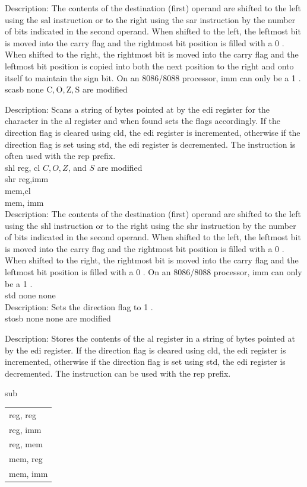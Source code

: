 \documentclass[10pt]{article}
\begin{document}
Description: The contents of the destination (first) operand are shifted to the left using the sal instruction or to the right using the sar instruction by the number of bits indicated in the second operand. When shifted to the left, the leftmost bit is moved into the carry flag and the rightmost bit position is filled with a 0 . When shifted to the right, the rightmost bit is moved into the carry flag and the leftmost bit position is copied into both the next position to the right and onto itself to maintain the sign bit. On an 8086/8088 processor, imm can only be a 1 .\\
scasb none $\mathrm{C}, \mathrm{O}, \mathrm{Z}, \mathrm{S}$ are modified

Description: Scans a string of bytes pointed at by the edi register for the character in the al register and when found sets the flags accordingly. If the direction flag is cleared using cld, the edi register is incremented, otherwise if the direction flag is set using std, the edi register is decremented. The instruction is often used with the rep prefix.\\
shl reg, cl $C, O, Z$, and $S$ are modified\\
shr reg,imm\\
mem,cl\\
mem, imm\\
Description: The contents of the destination (first) operand are shifted to the left using the shl instruction or to the right using the shr instruction by the number of bits indicated in the second operand. When shifted to the left, the leftmost bit is moved into the carry flag and the rightmost bit position is filled with a 0 . When shifted to the right, the rightmost bit is moved into the carry flag and the leftmost bit position is filled with a 0 . On an 8086/8088 processor, imm can only be a 1 .\\
std none none\\
Description: Sets the direction flag to 1 .\\
stosb none none are modified

Description: Stores the contents of the al register in a string of bytes pointed at by the edi register. If the direction flag is cleared using cld, the edi register is incremented, otherwise if the direction flag is set using std, the edi register is decremented. The instruction can be used with the rep prefix.

sub \begin{tabular}{l}
reg, reg \\
reg, imm \\
reg, mem \\
mem, reg \\
mem, imm \\
\end{tabular}
\end{document}

